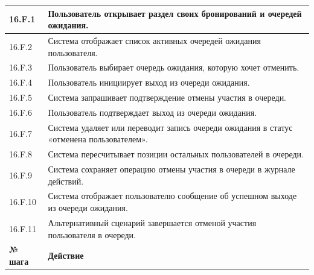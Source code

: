 \documentclass[12pt,a4paper]{article}
\begin{document}
\begin{xltabular}{\textwidth}{
				|>{\raggedright\arraybackslash}p{2.7cm}
				|>{\raggedright\arraybackslash}X|
			}
			16.F.1 & Пользователь открывает раздел своих бронирований и очередей
			ожидания. \\
			\hline
			16.F.2 & Система отображает список активных очередей ожидания пользователя. \\
			\hline
			16.F.3 & Пользователь выбирает очередь ожидания, которую хочет отменить. \\
			\hline
			16.F.4 & Пользователь инициирует выход из очереди ожидания. \\
			\hline
			16.F.5 & Система запрашивает подтверждение отмены участия в очереди. \\
			\hline
			16.F.6 & Пользователь подтверждает выход из очереди ожидания. \\
			\hline
			16.F.7 & Система удаляет или переводит запись очереди ожидания в статус
			«отменена пользователем». \\
			\hline
			16.F.8 & Система пересчитывает позиции остальных пользователей в очереди. \\
			\hline
			16.F.9 & Система сохраняет операцию отмены участия в очереди в журнале
			действий. \\
			\hline
			16.F.10 & Система отображает пользователю сообщение об успешном выходе из
			очереди ожидания. \\
			\hline
			16.F.11 & Альтернативный сценарий завершается отменой участия пользователя
			в очереди. \\
			\hline
			
			
			\textbf{№ шага} & \textbf{Действие} \\
			\hline
			

\end{xltabular}
\end{document}
